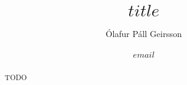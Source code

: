 \documentclass[11pt,a4paper]{article}
\begin{document}
\title{$title$}
\author{Ólafur Páll Geirsson \\\\ \href{mailto:$email$}{$email$}}

\date{}
\maketitle

\begin{abstract}
    TODO
\end{abstract}


% 

\end{document}
